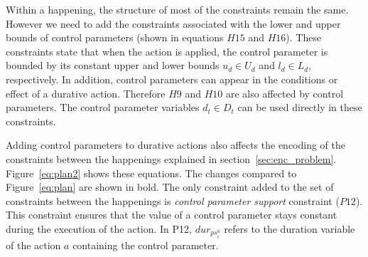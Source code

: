 Within a happening, the structure of most of the constraints remain the same. However we need to add the constraints associated with the lower and upper bounds of control parameters (shown in equations $H15$ and $H16$). These constraints state that when the action is applied, the control parameter is bounded by its constant upper and lower bounds $u_d\in U_d$ and $l_d \in L_d$, respectively. In addition, control parameters can appear in the conditions or effect of a durative action. Therefore $H9$ and $H10$ are also affected by control parameters. The control parameter variables $d_t\in D_t$ can be used directly in these constraints.

Adding control parameters to durative actions also affects the encoding of the constraints between the happenings explained in section~\ref{sec:enc_problem}. Figure~\ref{eq:plan2} shows these equations. The changes compared to Figure~\ref{eq:plan} are shown in bold.
The only constraint added to the set of constraints between the happenings is \textit{control parameter support} constraint ($P12$). This constraint ensures that the value of a control parameter stays constant during the execution of the action. In P12, $dur_{ps^a_i}$ refers to the duration variable of the action $a$ containing the control parameter.

